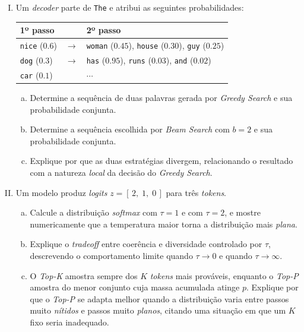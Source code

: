 \documentclass{dlproblemset}
\begin{document}
\begin{enumerate}[I)]
\item Um \textit{decoder} parte de \texttt{The} e atribui as seguintes probabilidades:

\begin{center}
\begin{tabular}{lcl}
    \toprule
    1º passo & & 2º passo \\
    \midrule
    \texttt{nice} \;($0.6$) & $\rightarrow$ & \texttt{woman} ($0.45$), \texttt{house} ($0.30$), \texttt{guy} ($0.25$) \\
    \texttt{dog} \;\;($0.3$) & $\rightarrow$ & \texttt{has} ($0.95$), \texttt{runs} ($0.03$), \texttt{and} ($0.02$) \\
    \texttt{car} \;\;($0.1$) & & $\cdots$ \\
    \bottomrule
\end{tabular}
\end{center}

\begin{enumerate}[(a)]
    \item Determine a sequência de duas palavras gerada por \textit{Greedy Search} e sua
    probabilidade conjunta.
    \item Determine a sequência escolhida por \textit{Beam Search} com $b = 2$ e sua
    probabilidade conjunta.
    \item Explique por que as duas estratégias divergem, relacionando o resultado com a natureza
    \emph{local} da decisão do \textit{Greedy Search}.
\end{enumerate}

\item Um modelo produz \textit{logits} $z = [\,2,\; 1,\; 0\,]$ para três \textit{tokens}.
\begin{enumerate}[(a)]
    \item Calcule a distribuição \textit{softmax} com $\tau = 1$ e com $\tau = 2$, e mostre
    numericamente que a temperatura maior torna a distribuição mais \emph{plana}.
    \item Explique o \textit{tradeoff} entre coerência e diversidade controlado por $\tau$,
    descrevendo o comportamento limite quando $\tau \to 0$ e quando $\tau \to \infty$.
    \item {} O \textit{Top-K} amostra sempre dos $K$ \textit{tokens}
    mais prováveis, enquanto o \textit{Top-P} amostra do menor conjunto cuja massa acumulada
    atinge $p$. Explique por que o \textit{Top-P} se adapta melhor quando a distribuição varia
    entre passos muito \emph{nítidos} e passos muito \emph{planos}, citando uma situação em que
    um $K$ fixo seria inadequado.
\end{enumerate}


\end{enumerate}
\end{document}
